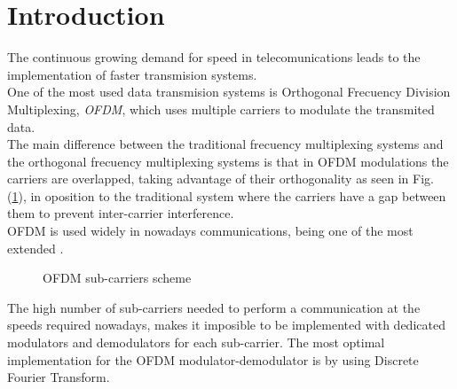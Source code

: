 \documentclass[conference]{IEEEtran}
\begin{document}
\section{Introduction}

The continuous growing demand for speed in telecomunications leads to the implementation of faster transmision systems.\\
One of the most used data transmision systems is Orthogonal Frecuency Division Multiplexing, \textit{OFDM}, which uses multiple carriers 
to modulate the transmited data.\\
The main difference between the traditional frecuency multiplexing systems and the orthogonal frecuency multiplexing systems is 
that in OFDM modulations the carriers are overlapped, taking advantage of their orthogonality as seen in Fig. (\ref{ofdm_carriers}), in oposition to the traditional 
system where the carriers have a gap between them to prevent inter-carrier interference.\\
OFDM is used widely in nowadays communications, being one of the most extended \cite{Prasad2_1}.

\begin{figure}[htb!]
\begin{minipage}[b]{1.0\linewidth}\centering
{}
\end{minipage}
\caption{OFDM sub-carriers scheme}
\label{ofdm_carriers}
\end{figure}

The high number of sub-carriers needed to perform a communication at the speeds required nowadays, makes it imposible to be implemented
with dedicated modulators and demodulators for each sub-carrier. The most optimal implementation for the OFDM modulator-demodulator 
is by using Discrete Fourier Transform.\\
\end{document}
